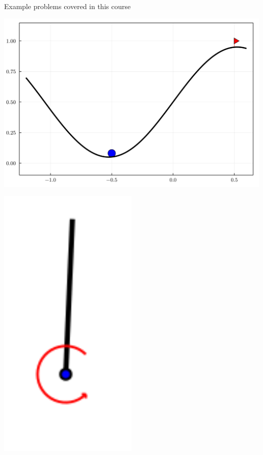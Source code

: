 \begin{frame}[fragile]{Example problems covered in this course}
\begin{minipage}[b]{0.18\textwidth}
    \includegraphics[align=c, width=1.0\textwidth]{images/mountain-car.png}
\end{minipage}
\hfill
\begin{minipage}[b]{0.18\textwidth}
    \centering
    \includegraphics[align=c, width=0.5\textwidth]{images/pendulum.png}
\end{minipage}

\end{frame}


